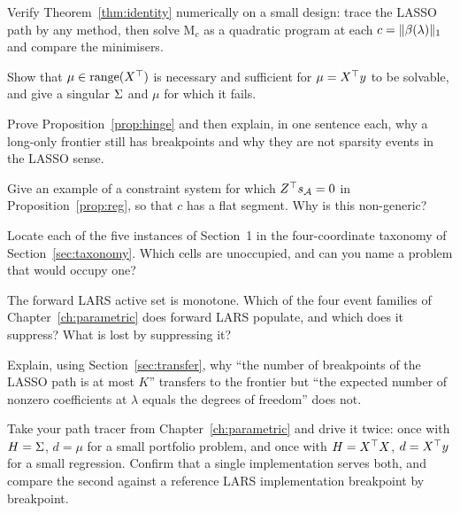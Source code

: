 \begin{exercises}

\begin{exercise}
Verify Theorem~\ref{thm:identity} numerically on a small design: trace the LASSO path
by any method, then solve $\mathrm{M}_c$ as a quadratic program at each
$c = \lVert \beta(\lambda) \rVert_1$ and compare the minimisers.
\end{exercise}

\begin{exercise}
Show that $\mu \in \operatorname{range}(X^{\top})$ is necessary and sufficient for $\mu = X^{\top} y$ to be
solvable, and give a singular $\Sigma$ and $\mu$ for which it fails.
\end{exercise}

\begin{exercise}
Prove Proposition~\ref{prop:hinge} and then explain, in one sentence each, why a
long-only frontier still has breakpoints and why they are not sparsity events in the
LASSO sense.
\end{exercise}

\begin{exercise}
Give an example of a constraint system for which $Z^{\top} s_{\mathcal{A}} = 0$ in
Proposition~\ref{prop:reg}, so that $c$ has a flat segment. Why is this non-generic?
\end{exercise}

\begin{exercise}
Locate each of the five instances of Section~1 in the four-coordinate taxonomy of
Section~\ref{sec:taxonomy}. Which cells are unoccupied, and can you name a problem
that would occupy one?
\end{exercise}

\begin{exercise}
The forward LARS active set is monotone. Which of the four event families of
Chapter~\ref{ch:parametric} does forward LARS populate, and which does it suppress?
What is lost by suppressing it?
\end{exercise}

\begin{exercise}
Explain, using Section~\ref{sec:transfer}, why ``the number of breakpoints of the
LASSO path is at most $K$'' transfers to the frontier but ``the expected number of
nonzero coefficients at $\lambda$ equals the degrees of freedom'' does not.
\end{exercise}

\begin{exercise}[Implementation]
Take your path tracer from Chapter~\ref{ch:parametric} and drive it twice: once with
$H = \Sigma$, $d = \mu$ for a small portfolio problem, and once with $H = X^{\top} X$,
$d = X^{\top} y$ for a small regression. Confirm that a single implementation serves both,
and compare the second against a reference LARS implementation breakpoint by
breakpoint.
\end{exercise}


\end{exercises}
